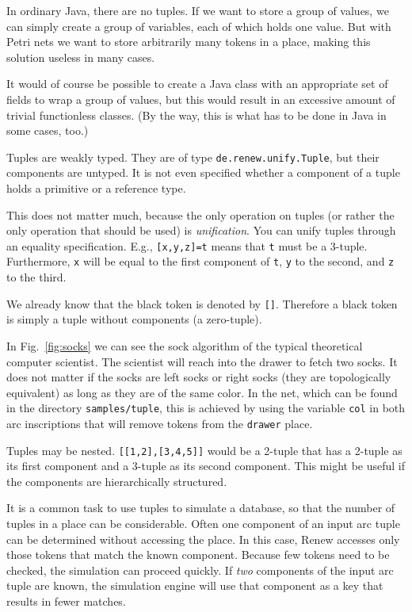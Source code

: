 In ordinary Java, there are no tuples. If we want to store a
group of values, we can simply create a group of variables,
each of which holds one value. But with Petri nets we want to
store arbitrarily many tokens in a place, making this solution
useless in many cases.

It would of course be possible to
create a Java class with an appropriate set of fields
to wrap a group of values, but this would result
in an excessive amount of trivial functionless classes.
(By the way, this is what has to be done in Java in some cases, too.)

Tuples are weakly typed. They are of type \texttt{de.renew.unify.Tuple},
but their components are untyped. It is not even specified
whether a component of a tuple holds a primitive or
a reference type.

This does not matter much, because the only operation on tuples
(or rather the only operation that should be used) is
\emph{unification}. You can unify tuples through an equality
specification. E.g., \texttt{[x,y,z]=t} means that
\texttt{t} must be a 3-tuple. Furthermore, \texttt{x} will be
equal to the first component of \texttt{t}, \texttt{y} to the second,
and \texttt{z} to the third.

We already know that the black token is denoted by \texttt{[]}.
Therefore a black token is simply a tuple without components
(a zero-tuple).


In Fig.~\ref{fig:socks} we can see the sock algorithm of the typical
theoretical computer scientist. The scientist will reach into the
drawer to fetch two socks. It does not matter if the
socks are left socks or right socks (they are topologically equivalent)
as long as they are of the same color.
In the net, which can be found in the
directory \texttt{samples/tuple}, this is achieved by using the
variable \texttt{col} in both arc inscriptions that will remove
tokens from the \texttt{drawer} place.

Tuples may be nested. \texttt{[[1,2],[3,4,5]]} would be a 2-tuple
that has a 2-tuple as its first component and a 3-tuple
as its second component. This might be useful if the components
are hierarchically structured.

It is a common task to use tuples to simulate a database,
so that the number of tuples in a place can be
considerable. Often one component of an input arc tuple can be determined
without accessing the place. In this case, Renew
accesses only those tokens that match the known component. Because few
tokens need to be checked, the simulation can proceed quickly.
If \emph{two} components of the input arc tuple
are known, the simulation engine will use that component as
a key that results in fewer matches.

